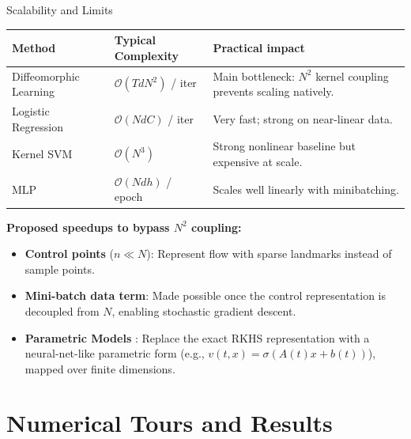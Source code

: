 \documentclass[aspectratio=169]{beamer}
\begin{document}
\begin{frame}{Scalability and Limits}
\small
\begin{tabular}{p{3.1cm}p{4.7cm}p{5.4cm}}
\toprule
Method & Typical Complexity & Practical impact \\
\midrule
Diffeomorphic Learning & $\mathcal{O}(T d N^2)$ / iter & Main bottleneck: $N^2$ kernel coupling prevents scaling natively. \\
Logistic Regression & $\mathcal{O}(N d C)$ / iter & Very fast; strong on near-linear data. \\
Kernel SVM & $\mathcal{O}(N^3)$ & Strong nonlinear baseline but expensive at scale. \\
MLP & $\mathcal{O}(N d h)$ / epoch & Scales well linearly with minibatching. \\
\bottomrule
\end{tabular}

\vspace{2mm}
\textbf{Proposed speedups to bypass $N^2$ coupling:}
\begin{itemize}
  \item \textbf{Control points} ($n\ll N$): Represent flow with sparse landmarks instead of sample points.
  \item \textbf{Mini-batch data term}: Made possible once the control representation is decoupled from $N$, enabling stochastic gradient descent.
  \item \textbf{Parametric Models }: Replace the exact RKHS representation with a neural-net-like parametric form (e.g., $v(t,x) = \sigma(A(t)x + b(t))$), mapped over finite dimensions.
\end{itemize}
\end{frame}

\section{Numerical Tours and Results}
\end{document}
